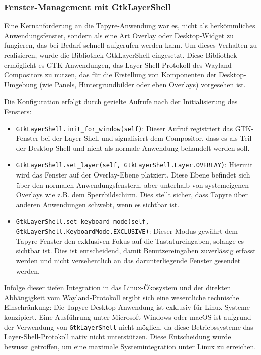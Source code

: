 \subsubsection{Fenster-Management mit GtkLayerShell}
Eine Kernanforderung an die Tapyre-Anwendung war es, nicht als herkömmliches Anwendungsfenster, sondern als eine Art Overlay oder Desktop-Widget zu fungieren, das bei Bedarf schnell aufgerufen werden kann. Um dieses Verhalten zu realisieren, wurde die Bibliothek GtkLayerShell eingesetzt. Diese Bibliothek ermöglicht es GTK-Anwendungen, das Layer-Shell-Protokoll des Wayland-Compositors zu nutzen, das für die Erstellung von Komponenten der Desktop-Umgebung (wie Panels, Hintergrundbilder oder eben Overlays) vorgesehen ist.

Die Konfiguration erfolgt durch gezielte Aufrufe nach der Initialisierung des Fensters:



\begin{itemize}
	\item \texttt{GtkLayerShell.init\_for\_window(self)}: Dieser Aufruf registriert das GTK-Fenster bei der Layer Shell und signalisiert dem Compositor, dass es als Teil der Desktop-Shell und nicht als normale Anwendung behandelt werden soll.
	\item \texttt{GtkLayerShell.set\_layer(self, GtkLayerShell.Layer.OVERLAY)}: Hiermit wird das Fenster auf der Overlay-Ebene platziert. Diese Ebene befindet sich über den normalen Anwendungsfenstern, aber unterhalb von systemeigenen Overlays wie z.B. dem Sperrbildschirm. Dies stellt sicher, dass Tapyre über anderen Anwendungen schwebt, wenn es sichtbar ist.
	\item \texttt{GtkLayerShell.set\_keyboard\_mode(self, \\ GtkLayerShell.KeyboardMode.EXCLUSIVE)}: Dieser Modus gewährt dem Tapyre-Fenster den exklusiven Fokus auf die Tastatureingaben, solange es sichtbar ist. Dies ist entscheidend, damit Benutzereingaben zuverlässig erfasst werden und nicht versehentlich an das darunterliegende Fenster gesendet werden.
\end{itemize}

Infolge dieser tiefen Integration in das Linux-Ökosystem und der direkten Abhängigkeit vom Wayland-Protokoll ergibt sich eine wesentliche technische Einschränkung: Die Tapyre-Desktop-Anwendung ist exklusiv für Linux-Systeme konzipiert. Eine Ausführung unter Microsoft Windows oder macOS ist aufgrund der Verwendung von \texttt{GtkLayerShell} nicht möglich, da diese Betriebssysteme das Layer-Shell-Protokoll nativ nicht unterstützen. Diese Entscheidung wurde bewusst getroffen, um eine maximale Systemintegration unter Linux zu erreichen.

